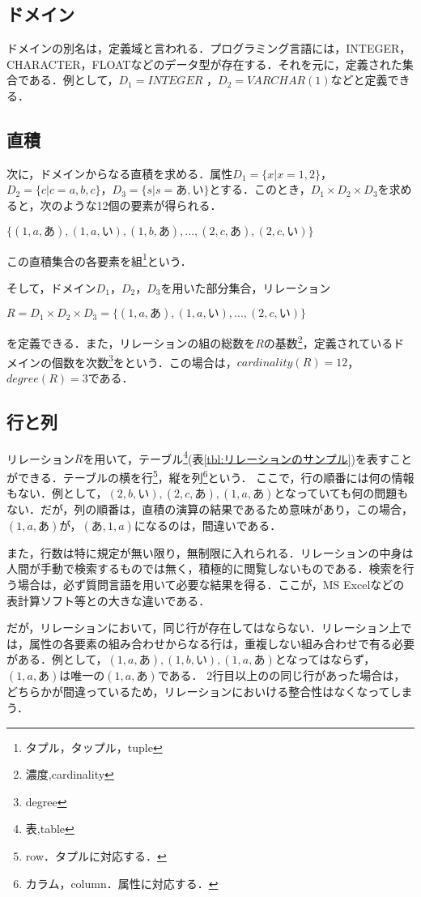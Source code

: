 \documentclass[a4paper,10pt]{jreport}
\begin{document}
\subsection{ドメイン}
ドメインの別名は，定義域と言われる．プログラミング言語には，INTEGER，CHARACTER，FLOATなどのデータ型が存在する．それを元に，定義された集合である．例として，$D_1=INTEGER$ ，$D_2=VARCHAR(1)$などと定義できる．
\subsection{直積}
\par 次に，ドメインからなる直積を求める．属性$D_1=\{x|x=1,2\}$，$D_2=\{c|c=a,b,c\}$，$D_3=\{s|s=あ,い\}$とする．このとき，$D_1 \times D_2 \times D_3$を求めると，次のような12個の要素が得られる．
\begin{center}
	$\{(1,a,あ),(1,a,い),(1,b,あ),...,(2,c,あ),(2,c,い)\}$
\end{center}
この直積集合の各要素を組\footnote{タプル，タップル，tuple}という．
\par そして，ドメイン$D_1$，$D_2$，$D_3$を用いた部分集合，リレーション
\begin{center}
	$R=D_1 \times D_2 \times D_3=\{(1,a,あ),(1,a,い),...,(2,c,い)\}$
\end{center}
を定義できる．また，リレーションの組の総数を$R$の基数\footnote{濃度,cardinality}，定義されているドメインの個数を次数\footnote{degree}をという．この場合は，$cardinality(R)=12$，$degree(R)=3$である．

\subsection{行と列}
リレーション$R$を用いて，テーブル\footnote{表,table}(表\ref{tbl:リレーションのサンプル})を表すことができる．テーブルの横を行\footnote{row．タプルに対応する．}，縦を列\footnote{カラム，column．属性に対応する．}という．
ここで，行の順番には何の情報もない．例として，$(2,b,い),(2,c,あ),(1,a,あ)$となっていても何の問題もない．だが，列の順番は，直積の演算の結果であるため意味があり，この場合，$(1,a,あ)$が，$(あ,1,a)$になるのは，間違いである．
\par また，行数は特に規定が無い限り，無制限に入れられる．リレーションの中身は人間が手動で検索するものでは無く，積極的に閲覧しないものである．検索を行う場合は，必ず質問言語を用いて必要な結果を得る．ここが，MS Excelなどの表計算ソフト等との大きな違いである．
\par だが，リレーションにおいて，同じ行が存在してはならない．リレーション上では，属性の各要素の組み合わせからなる行は，重複しない組み合わせで有る必要がある．例として，$(1,a,あ),(1,b,い),(1,a,あ)$となってはならず，$(1,a,あ)$は唯一の$(1,a,あ)$である．
2行目以上のの同じ行があった場合は，どちらかが間違っているため，リレーションにおいける整合性はなくなってしまう．
\end{document}
